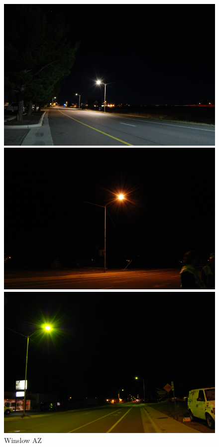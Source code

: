 \documentclass[11pt,twocolumn]{article} %
\begin{document}
\begin{figure}
  \begin{multicols}{3}
    \includegraphics[width=\columnwidth]{./images/wa.png}

    \includegraphics[width=\columnwidth]{./images/wb.png}

    \includegraphics[width=\columnwidth]{./images/wc.png}
  \end{multicols}
        \caption{Winslow AZ}
        \label{fig:winslow}
\end{figure}
\end{document}
